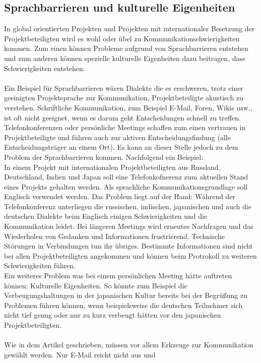 \documentclass[12pt]{scrartcl}
\begin{document}
\subsection{Sprachbarrieren und kulturelle Eigenheiten}
In global orientierten Projekten und Projekten mit internationaler Besetzung der Projektbeteiligten wird es wohl oder übel zu Kommunikationschwierigkeiten kommen. Zum einen können Probleme aufgrund von Sprachbarrieren entstehen und zum anderen können spezielle kulturelle Eigenheiten dazu beitragen, dass Schwierigkeiten entstehen. \\
\\
Ein Beispiel für Sprachbarrieren wären Dialekte die es erschweren, trotz einer geeinigten Projektsprache zur Kommunikation, Projektbeteiligte akustisch zu verstehen. Schriftliche Kommunikation, zum Beispiel E-Mail, Foren, Wikis usw., ist oft nicht geeignet, wenn es darum geht Entscheidungen schnell zu treffen. Telefonkonferenzen oder persönliche Meetings schaffen zum einen vertrauen in Projektbeteiligte und führen auch zur aktiven Entscheidungsfindung (alle Entscheidungsträger an einem Ort). Es kann an dieser Stelle jedoch zu dem Problem der Sprachbarrieren kommen. Nachfolgend ein Beispiel: \\
In einem Projekt mit internationalen Projektbeteiligten aus Russland, Deutschland, Indien und Japan soll eine Telefonkofnerenz zum aktuellen Stand eines Projekts gehalten werden. Als sprachliche Kommunikationsgrundlage soll Englisch verwendet werden. Das Problem liegt auf der Hand: Während der Telefonkonferenz unterliegen die russischen, indischen, japanischen und auch die deutschen Dialekte beim Englisch einigen Schwierigkeiten und die Kommunikation leidet. Bei längeren Meetings wird erneutes Nachfragen und das Wiederholen von Gedanken und Informationen frustrierend. Technische Störungen in Verbindungen tun ihr übriges. Bestimmte Informationen sind nicht bei allen Projektbeteiligten angekommen und können beim Protrokoll zu weiteren Schwierigkeiten führen. \\
Ein weiteres Problem was bei einem persönlichen Meeting hätte auftreten können: Kulturelle Eigenheiten. So könnte zum Beispiel die Verbeugungshaltungen in der japanischen Kultur bereits bei der Begrüßung zu Problemen führen können, wenn beispielsweise die deutschen Teilnehmer sich nicht tief genug oder nur zu kurz verbeugt hätten vor den japanischen Projektbeteiligten. \\
\\
Wie in dem Artikel \cite{nur_emails_sind_zu_wenig} geschrieben, müssen vor allem Erkzeuge zur Kommunikation gewählt werden. Nur E-Mail reicht nicht aus und 
\end{document}
